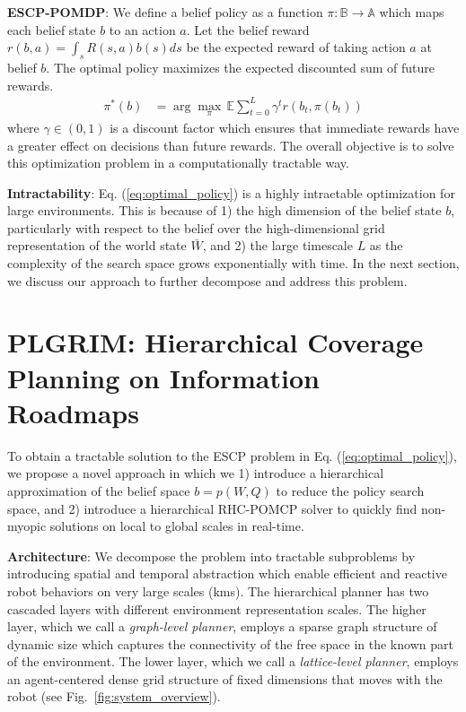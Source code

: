 \documentclass{article}
\newcommand{\ph}[1]{{\textbf{#1}:}} %
\begin{document}
\ph{ESCP-POMDP} We define a belief policy as a function $\pi : \mathbb{B} \rightarrow \mathbb{A}$ which maps each belief state $b$ to an action $a$.  Let the belief reward $r(b,a)=\int_s R(s,a)b(s)ds$ be the expected reward of taking action $a$ at belief $b$.  The optimal policy maximizes the expected discounted sum of future rewards.
\begin{align}
  \pi^*(b) &= \arg\max_\pi \, \mathbb{E} \sum_{t=0}^{L} \gamma^t r(b_t, \pi(b_t)) 
  \label{eq:optimal_policy}
\end{align}
where $\gamma \in (0,1)$ is a discount factor which ensures that immediate rewards have a greater effect on decisions than future rewards. The overall objective is to solve this optimization problem in a computationally tractable way.

\ph{Intractability} 
Eq. (\ref{eq:optimal_policy}) is a highly intractable optimization for large environments. This is because of 1) the high dimension of the belief state $b$, particularly with respect to the belief over the high-dimensional grid representation of the world state $\bar{W}$, and 2) the large timescale $L$ as the complexity of the search space grows exponentially with time. In the next section, we discuss our approach to further decompose and address this problem.


\section{PLGRIM: Hierarchical Coverage Planning on Information Roadmaps}
\label{sec:plgrim}

To obtain a tractable solution to the ESCP problem in Eq. (\ref{eq:optimal_policy}), we propose a novel approach in which we 1) introduce a hierarchical approximation of the belief space $b=p(W,Q)$ to reduce the policy search space, and 2) introduce a hierarchical RHC-POMCP solver to quickly find non-myopic solutions on local to global scales in real-time.

\ph{Architecture}  We decompose the problem into tractable subproblems by introducing spatial and temporal abstraction which enable efficient and reactive robot behaviors on very large scales (kms).  The hierarchical planner has two cascaded layers with different environment representation scales. The higher layer, which we call a \emph{graph-level planner}, employs a sparse graph structure of dynamic size which captures the connectivity of the free space in the known part of the environment. The lower layer, which we call a \emph{lattice-level planner}, employs an agent-centered dense grid structure of fixed dimensions that moves with the robot (see Fig.~\ref{fig:system_overview}). %
\end{document}
